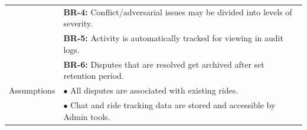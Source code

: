 \begin{longtable}{|>{\raggedright\arraybackslash}p{4cm}|>{\raggedright\arraybackslash}p{11cm}|}
& \textbf{BR-4:} Conflict/adversarial issues may be divided into levels of severity. \\
& \textbf{BR-5:} Activity is automatically tracked for viewing in audit logs. \\
& \textbf{BR-6:} Disputes that are resolved get archived after set retention period. \\
\hline
Assumptions & $\bullet$ All disputes are associated with existing rides. \\
& $\bullet$ Chat and ride tracking data are stored and accessible by Admin tools. \\
\hline
\end{longtable}

